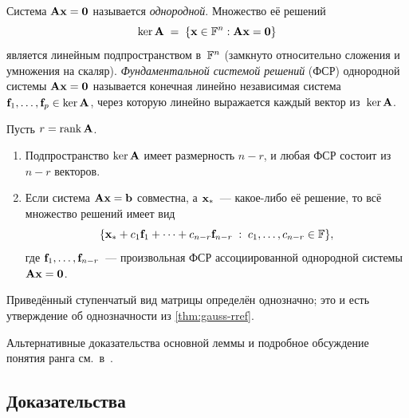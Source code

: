 \begin{definition}
\label{def:fsr}
Система $\mathbf{A}\mathbf{x} = \mathbf{0}$ называется \emph{однородной}.
Множество её решений
\[
  \ker \mathbf{A} \;=\; \{\mathbf{x} \in \mathbb{F}^n : \mathbf{A}\mathbf{x} = \mathbf{0}\}
\]
является линейным подпространством в~$\mathbb{F}^n$ (замкнуто относительно
сложения и умножения на скаляр). \emph{Фундаментальной системой решений}
(ФСР) однородной системы $\mathbf{A}\mathbf{x} = \mathbf{0}$ называется
конечная линейно независимая система
$\mathbf{f}_1, \dots, \mathbf{f}_p \in \ker \mathbf{A}$, через которую линейно
выражается каждый вектор из~$\ker \mathbf{A}$.
\end{definition}

\begin{theorem}
\label{thm:solution-structure}
Пусть $r = \operatorname{rank} \mathbf{A}$.
\begin{enumerate}[label=(\alph*)]
  \item Подпространство $\ker \mathbf{A}$ имеет размерность $n - r$, и
        любая ФСР состоит из $n - r$ векторов.
  \item Если система $\mathbf{A}\mathbf{x} = \mathbf{b}$ совместна, а
        $\mathbf{x}_*$~--- какое-либо её решение, то всё множество
        решений имеет вид
        \[
          \{\mathbf{x}_* + c_1 \mathbf{f}_1 + \dots + c_{n-r} \mathbf{f}_{n-r}
          \;:\; c_1, \dots, c_{n-r} \in \mathbb{F}\},
        \]
        где $\mathbf{f}_1, \dots, \mathbf{f}_{n-r}$~--- произвольная ФСР
        ассоциированной однородной системы $\mathbf{A}\mathbf{x} = \mathbf{0}$.
\end{enumerate}
\end{theorem}

\begin{corollary}
\label{cor:rref-unique}
Приведённый ступенчатый вид матрицы определён однозначно; это и есть
утверждение об однозначности из \cref{thm:gauss-rref}.
\end{corollary}

\begin{remark}
Альтернативные доказательства основной леммы и подробное обсуждение
понятия ранга см.\ в~\cite{Beklemishev2025}.
\end{remark}

\subsection*{Доказательства}

